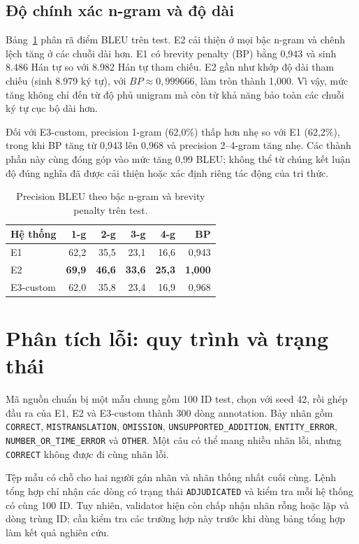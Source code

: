 \documentclass[11pt,twocolumn]{article}
\begin{document}
\subsection{Độ chính xác n-gram và độ dài}

Bảng~\ref{tab:ngram} phân rã điểm BLEU trên test. E2 cải thiện ở mọi bậc
n-gram và chênh lệch tăng ở các chuỗi dài hơn. E1 có brevity penalty (BP) bằng
0,943 và sinh 8.486 Hán tự so với 8.982 Hán tự tham chiếu. E2 gần như khớp độ
dài tham chiếu (sinh 8.979 ký tự), với $BP\approx0{,}999666$, làm tròn thành 1,000. Vì vậy, mức tăng không chỉ đến từ
độ phủ unigram mà còn từ khả năng bảo toàn các chuỗi ký tự cục bộ dài hơn.

Đối với E3-custom, precision 1-gram (62,0\%) thấp hơn nhẹ so với E1
(62,2\%), trong khi BP tăng từ 0,943 lên 0,968 và precision 2--4-gram
tăng nhẹ. Các thành phần này cùng đóng góp vào mức tăng 0,99 BLEU;
không thể từ chúng kết luận độ đúng nghĩa đã được cải thiện hoặc
xác định riêng tác động của tri thức.

\begin{table}[t]
\centering
\small
\caption{Precision BLEU theo bậc n-gram và brevity penalty trên test.}
\label{tab:ngram}
\begin{tabular}{lrrrrr}
\toprule
Hệ thống & 1-g & 2-g & 3-g & 4-g & BP \\
\midrule
E1 & 62,2 & 35,5 & 23,1 & 16,6 & 0,943 \\
E2 & \textbf{69,9} & \textbf{46,6} & \textbf{33,6} & \textbf{25,3} & \textbf{1,000} \\
E3-custom & 62,0 & 35,8 & 23,4 & 16,9 & 0,968 \\
\bottomrule
\end{tabular}
\end{table}

\section{Phân tích lỗi: quy trình và trạng thái}

Mã nguồn chuẩn bị một mẫu chung gồm 100 ID test, chọn với seed 42,
rồi ghép đầu ra của E1, E2 và E3-custom thành 300 dòng annotation.
Bảy nhãn gồm \texttt{CORRECT}, \texttt{MISTRANSLATION},
\texttt{OMISSION}, \texttt{UNSUPPORTED\_ADDITION},
\texttt{ENTITY\_ERROR}, \texttt{NUMBER\_OR\_TIME\_ERROR} và
\texttt{OTHER}. Một câu có thể mang nhiều nhãn lỗi, nhưng
\texttt{CORRECT} không được đi cùng nhãn lỗi.

Tệp mẫu có chỗ cho hai người gán nhãn và nhãn thống nhất cuối cùng.
Lệnh tổng hợp chỉ nhận các dòng có trạng thái \texttt{ADJUDICATED}
và kiểm tra mỗi hệ thống có cùng 100 ID. Tuy nhiên, validator hiện còn
chấp nhận nhãn rỗng hoặc lặp và dòng trùng ID; cần kiểm tra các trường hợp
này trước khi dùng bảng tổng hợp làm kết quả nghiên cứu.
\end{document}
